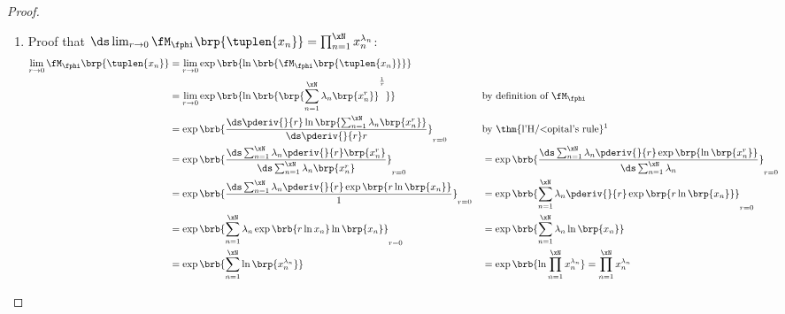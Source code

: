 \begin{proof}
\begin{enumerate}
  \item Proof that $\ds\lim_{r\to0} \fM_\fphi\brp{\tuplen{x_n}} = \prod_{n=1}^{\xN} x_n^{\lambda_n}$:
    \begin{align*}
      \lim_{r\to0} \fM_\fphi\brp{\tuplen{x_n}}
        &= \lim_{r\to0} \exp\brb{\ln\brb{\fM_\fphi\brp{\tuplen{x_n}}}}
      \\&= \lim_{r\to0} \exp\brb{\ln\brb{\brp{\sum_{n=1}^{\xN}\lambda_n\brp{x_n^r}}^\frac{1}{r}}}
        && \text{by definition of $\fM_\fphi$}
      \\&= \exp\brb{\frac{\ds\pderiv{}{r}\ln\brp{\sum_{n=1}^{\xN}\lambda_n\brp{x_n^r}}}{\ds\pderiv{}{r}r}}_{r=0}
        && \text{by \thm{l'H{/<o}pital's rule}\footnotemark}
      \\&= \exp\brb{\frac{\ds\sum_{n=1}^{\xN}\lambda_n\pderiv{}{r}\brp{x_n^r}}
                         {\ds\sum_{n=1}^{\xN}\lambda_n\brp{x_n^r}}
                   }_{r=0}
       &&= \exp\brb{\frac{\ds\sum_{n=1}^{\xN}\lambda_n\pderiv{}{r}\exp\brp{\ln\brp{x_n^r}}}
                         {\ds\sum_{n=1}^{\xN}\lambda_n}
                   }_{r=0}
      \\&= \exp\brb{\frac{\ds\sum_{n=1}^{\xN}\lambda_n\pderiv{}{r}\exp\brp{r\ln\brp{x_n}}}
                         {1}
                   }_{r=0}
       &&= \exp\brb{\sum_{n=1}^{\xN}\lambda_n\pderiv{}{r}\exp\brp{r\ln\brp{x_n}}
                   }_{r=0}
      \\&= \exp\brb{\sum_{n=1}^{\xN}\lambda_n\exp\brb{r\ln{x_n}}\ln\brp{x_n}
                   }_{r=0}
       &&= \exp\brb{\sum_{n=1}^{\xN}\lambda_n\ln\brp{x_n}}
      \\&= \exp\brb{\sum_{n=1}^{\xN}\ln\brp{x_n^{\lambda_n}}}
       &&= \exp\brb{\ln\prod_{n=1}^{\xN}x_n^{\lambda_n}}
         = \prod_{n=1}^{\xN} x_n^{\lambda_n}
    \end{align*}
\end{enumerate}
\end{proof}


